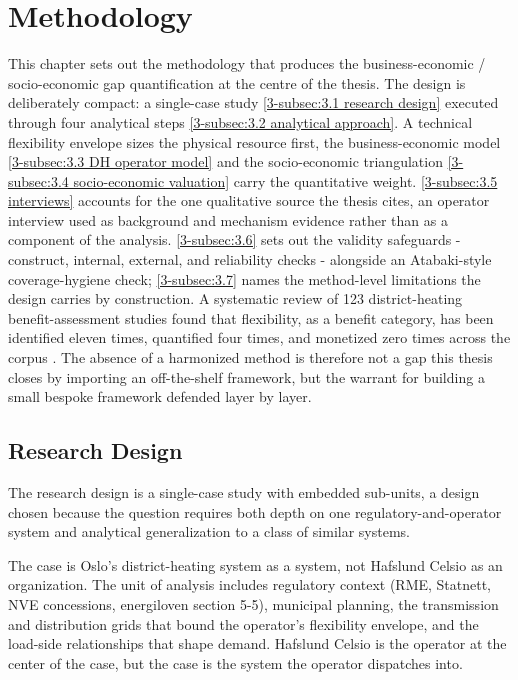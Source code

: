 \section{Methodology}
\label{3-sec:3}

This chapter sets out the methodology that produces the business-economic / socio-economic gap quantification at the centre of the thesis. The design is deliberately compact: a single-case study \autoref{3-subsec:3.1 research design} executed through four analytical steps \autoref{3-subsec:3.2 analytical approach}. A technical flexibility envelope sizes the physical resource first, the business-economic model \autoref{3-subsec:3.3 DH operator model} and the socio-economic triangulation \autoref{3-subsec:3.4 socio-economic valuation} carry the quantitative weight. \autoref{3-subsec:3.5 interviews} accounts for the one qualitative source the thesis cites, an operator interview used as background and mechanism evidence rather than as a component of the analysis. \autoref{3-subsec:3.6} sets out the validity safeguards - construct, internal, external, and reliability checks - alongside an Atabaki-style coverage-hygiene check; \autoref{3-subsec:3.7} names the method-level limitations the design carries by construction. A systematic review of 123 district-heating benefit-assessment studies found that flexibility, as a benefit category, has been identified eleven times, quantified four times, and monetized zero times across the corpus \cite{ahmed_district_2025}. The absence of a harmonized method is therefore not a gap this thesis closes by importing an off-the-shelf framework, but the warrant for building a small bespoke framework defended layer by layer.

\subsection{Research Design}
\label{3-subsec:3.1 research design}

The research design is a single-case study with embedded sub-units, a design chosen because the question requires both depth on one regulatory-and-operator system and analytical generalization to a class of similar systems.

The case is Oslo's district-heating system as a system, not Hafslund Celsio as an organization. The unit of analysis includes regulatory context (RME, Statnett, NVE concessions, energiloven section 5-5), municipal planning, the transmission and distribution grids that bound the operator's flexibility envelope, and the load-side relationships that shape demand. Hafslund Celsio is the operator at the center of the case, but the case is the system the operator dispatches into. 


